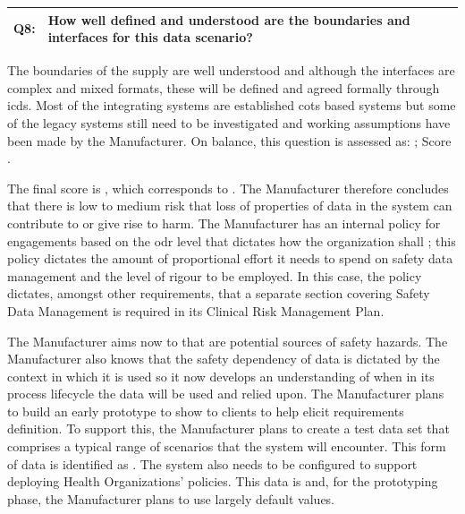\begin{longtable*}[H]
  {|L{}|L{}|}
  \hline
  Q8: & How well defined and understood are the boundaries and interfaces for this data scenario?\\
  \hline
\end{longtable*}

The boundaries of the supply are well understood and although the interfaces are complex and mixed formats, these will be defined and agreed formally through \glspl{icd}. Most of the integrating systems are established \gls{cots} based systems but some of the legacy systems still need to be investigated and working assumptions have been
made
by the Manufacturer. On balance, this question is assessed as: ; Score .

The final score is , which corresponds to . The Manufacturer therefore concludes that there is low to medium risk that loss of properties of data in the system can contribute to or give rise to harm. The Manufacturer has an internal policy for engagements based on the \gls{odr} level that dictates how the organization shall ; this policy dictates the amount of proportional effort it needs to spend on safety data management and the level of rigour to be employed. In this case, the policy dictates, amongst other requirements, that a separate section covering Safety Data Management is required in its Clinical Risk Management Plan.

The Manufacturer aims now to  that are potential sources of safety hazards. The Manufacturer also knows that the safety dependency of data is dictated by the context in which it is used so it now develops an understanding of when in its process lifecycle the data will be used and relied upon. The Manufacturer plans to build an early prototype to show to clients to help elicit requirements definition. To support this, the Manufacturer plans to create a test data set that comprises a typical range of scenarios that the system will encounter. This form of data is identified as . The system also needs to be configured to support deploying Health Organizations' policies. This data is  and, for the prototyping phase, the Manufacturer plans to use largely default values.

